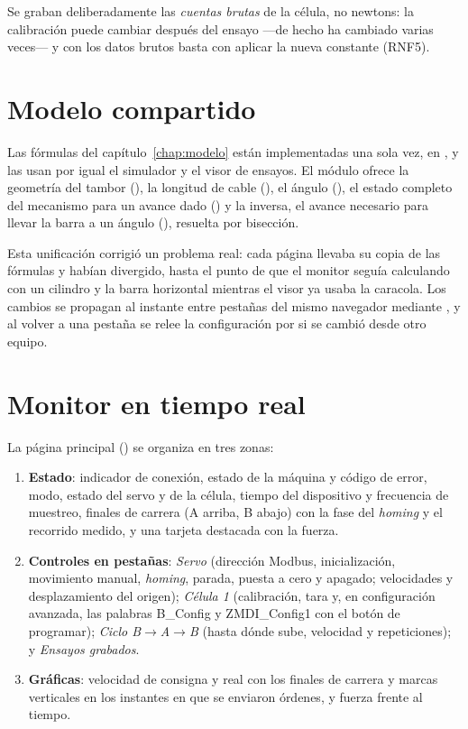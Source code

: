 Se graban deliberadamente las \emph{cuentas brutas} de la célula, no newtons: la calibración puede
cambiar después del ensayo ---de hecho ha cambiado varias veces--- y con los datos brutos basta con
aplicar la nueva constante (RNF5).

\section{Modelo compartido}

Las fórmulas del capítulo~\ref{chap:modelo} están implementadas una sola vez, en
, y las usan por igual el simulador y el visor de ensayos. El módulo
ofrece la geometría del tambor (), la longitud de cable (), el ángulo
(), el estado completo del mecanismo para un avance dado () y la
inversa, el avance necesario para llevar la barra a un ángulo (), resuelta por
bisección.

Esta unificación corrigió un problema real: cada página llevaba su copia de las fórmulas y habían
divergido, hasta el punto de que el monitor seguía calculando con un cilindro y la barra horizontal
mientras el visor ya usaba la caracola. Los cambios se propagan al instante entre pestañas del mismo
navegador mediante , y al volver a una pestaña se relee la configuración
por si se cambió desde otro equipo.

\section{Monitor en tiempo real}

La página principal () se organiza en tres zonas:

\begin{enumerate}
  \item \textbf{Estado}: indicador de conexión, estado de la máquina y código de error, modo, estado
        del servo y de la célula, tiempo del dispositivo y frecuencia de muestreo, finales de
        carrera (A arriba, B abajo) con la fase del \emph{homing} y el recorrido medido, y una
        tarjeta destacada con la fuerza.
  \item \textbf{Controles en pestañas}: \emph{Servo} (dirección Modbus, inicialización, movimiento
        manual, \emph{homing}, parada, puesta a cero y apagado; velocidades y desplazamiento del
        origen); \emph{Célula 1} (calibración, tara y, en configuración avanzada, las palabras
        B\_Config y ZMDI\_Config1 con el botón de programar); \emph{Ciclo B$\rightarrow$A$\rightarrow$B}
        (hasta dónde sube, velocidad y repeticiones); y \emph{Ensayos grabados}.
  \item \textbf{Gráficas}: velocidad de consigna y real con los finales de carrera y marcas
        verticales en los instantes en que se enviaron órdenes, y fuerza frente al tiempo.
\end{enumerate}

